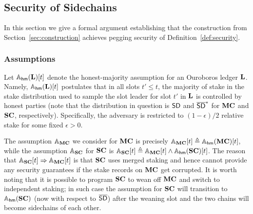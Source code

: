\subsection{Security of Sidechains}
\label{sec:security}

In this section we give a formal argument
establishing that the
construction from Section~\ref{sec:construction} achieves
pegging security of
Definition~\ref{def:security}.

\subsubsection{Assumptions}

Let $\mathbb{A}_{\mathsf{hm}}(\mathbf{L})[t]$ denote the honest-majority assumption for an
Ouroboros ledger $\mathbf{L}$. Namely, $\mathbb{A}_{\mathsf{hm}}(\mathbf{L})[t]$ postulates that
in all slots $t' \leq t$, the majority of stake in the stake distribution used to
sample the slot leader for slot $t'$ in $\mathbf{L}$ is controlled by honest parties
(note that the distribution in question is $\mathsf{SD}$ and $\mathsf{\overline{SD}}^*$ for $\mathbf{MC}$ and
$\mathbf{SC}$, respectively).
Specifically, the adversary is restricted to $(1 - \epsilon)/{2}$ relative stake
for some fixed $\epsilon>0$.

The assumption $\mathbb{A}_{\mathbf{MC}}$ we consider for $\mathbf{MC}$
is precisely $\mathbb{A}_{\mathbf{MC}}[t]\triangleq\mathbb{A}_{\mathsf{hm}}(\mathbf{MC})[t]$, while the assumption $\mathbb{A}_{\mathbf{SC}}$ for $\mathbf{SC}$ is
$\mathbb{A}_{\mathbf{SC}}[t]\triangleq\mathbb{A}_{\mathbf{MC}}[t]\land\mathbb{A}_{\mathsf{hm}}(\mathbf{SC})[t]$. The reason that
$\mathbb{A}_{\mathbf{SC}}[t]\Rightarrow\mathbb{A}_{\mathbf{MC}}[t]$ is that $\mathbf{SC}$ uses merged staking and hence
cannot provide any security guarantees if the stake records on $\mathbf{MC}$ get
corrupted. It is worth noting that it is possible to program $\mathbf{SC}$ to wean off
$\mathbf{MC}$ and switch to independent staking; in such case the assumption for $\mathbf{SC}$
will transition to $\mathbb{A}_{\mathsf{hm}}(\mathbf{SC})$ (now with respect to $\mathsf{\overline{SD}}$) after the
weaning slot and the two chains will become sidechains of each other.

